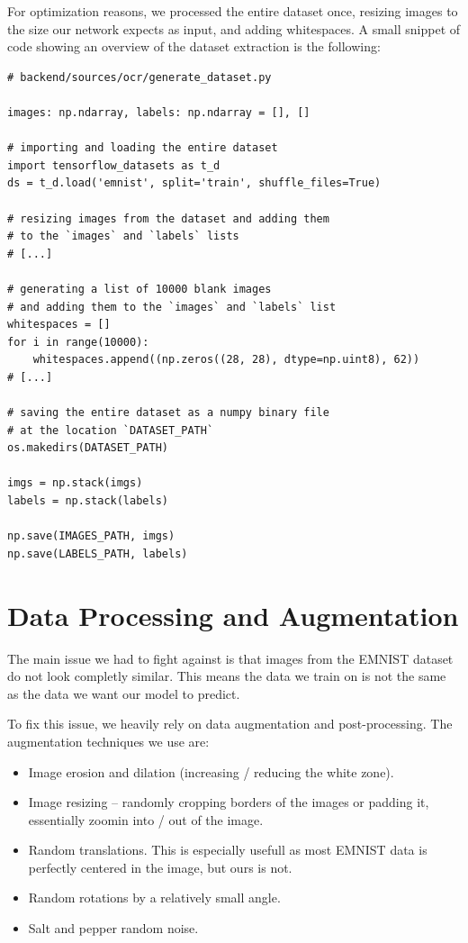 \documentclass[12pt, a4paper]{report}
\begin{document}
For optimization reasons, we processed the entire dataset once, resizing images to the size our network expects as input, and adding whitespaces. A small snippet of code showing an overview of the dataset extraction is the following:


\begin{verbatim}
# backend/sources/ocr/generate_dataset.py

images: np.ndarray, labels: np.ndarray = [], []

# importing and loading the entire dataset
import tensorflow_datasets as t_d
ds = t_d.load('emnist', split='train', shuffle_files=True)

# resizing images from the dataset and adding them
# to the `images` and `labels` lists
# [...]

# generating a list of 10000 blank images
# and adding them to the `images` and `labels` list
whitespaces = []
for i in range(10000):
    whitespaces.append((np.zeros((28, 28), dtype=np.uint8), 62))
# [...]

# saving the entire dataset as a numpy binary file
# at the location `DATASET_PATH`
os.makedirs(DATASET_PATH)

imgs = np.stack(imgs)
labels = np.stack(labels)

np.save(IMAGES_PATH, imgs)
np.save(LABELS_PATH, labels)
\end{verbatim}

\section{Data Processing and Augmentation}

The main issue we had to fight against is that images from the EMNIST dataset do not look completly similar. This means the data we train on is not the same as the data we want our model to predict.

To fix this issue, we heavily rely on data augmentation and post-processing. The augmentation techniques we use are:
\begin{itemize}
	\item Image erosion and dilation (increasing / reducing the white zone).
	\item Image resizing -- randomly cropping borders of the images or padding it, essentially zoomin into / out of the image.
	\item Random translations. This is especially usefull as most EMNIST data is perfectly centered in the image, but ours is not.
	\item Random rotations by a relatively small angle.
	\item Salt and pepper random noise.
\end{itemize}
\end{document}
